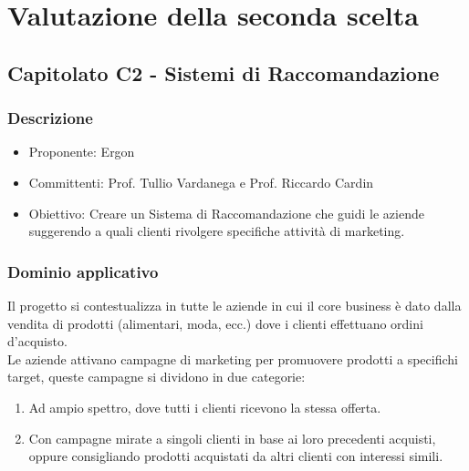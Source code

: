 \documentclass[a4paper, 11pt]{article}
\begin{document}
\pagebreak

\section{Valutazione della seconda scelta}
\subsection{Capitolato C2 - Sistemi di Raccomandazione}
\subsubsection{Descrizione}
    \begin{itemize}
        \item Proponente: Ergon
        \item Committenti: Prof. Tullio Vardanega e Prof. Riccardo Cardin
        \item Obiettivo: Creare un Sistema di Raccomandazione che guidi le aziende suggerendo a quali clienti rivolgere specifiche attività di marketing.
\end{itemize}
\subsubsection{Dominio applicativo}

Il progetto si contestualizza in tutte le aziende in cui il core business è dato dalla vendita di prodotti (alimentari, moda, ecc.) dove i clienti effettuano ordini d'acquisto. \\
Le aziende attivano campagne di marketing per promuovere prodotti a specifichi target, queste campagne si dividono in due categorie:
\begin{enumerate}
    \item Ad ampio spettro, dove tutti i clienti ricevono la stessa offerta.
    \item Con campagne mirate a singoli clienti in base ai loro precedenti acquisti, oppure consigliando prodotti acquistati da altri clienti con interessi simili.
\end{enumerate}
\end{document}
